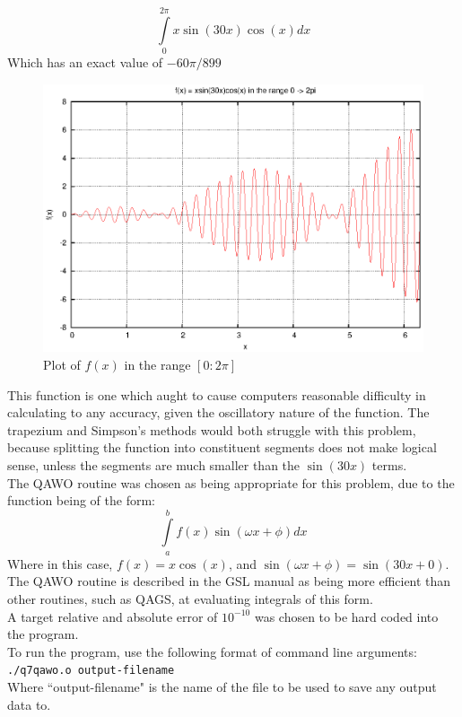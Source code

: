 \documentclass[pdf,color]{UoBnote}
\begin{document}
			\begin{equation}\label{eq:int2}
				\int\limits_0^{2\pi}x\sin{(30x)}\cos{(x)} dx	
			\end{equation}
			Which has an exact value of $-60\pi/899$
			\begin{figure}[H]
					\centering
						\includegraphics{figures/q7b_labelled.eps}
					\caption{Plot of $f(x)$ in the range $[0:2\pi]$}
					\label{fig:q7b}
				\end{figure}
				This function is one which aught to cause computers reasonable difficulty in calculating to any accuracy, given the oscillatory nature of the function. The trapezium and Simpson's methods would both struggle with this problem, because splitting the function into constituent segments does not make logical sense, unless the segments are much smaller than the $\sin(30x)$ terms.\\
			The QAWO routine was chosen as being appropriate for this problem, due to the function being of the form:
			\begin{equation}
			\int\limits_a^b f(x)\sin(\omega x + \phi) dx
			\end{equation}
			Where in this case, $f(x) = x\cos(x)$, and $\sin(\omega x +\phi) = \sin(30x + 0)$.\\
			The QAWO routine is described in the GSL manual as being more efficient than other routines, such as QAGS, at evaluating integrals of this form.\\
			A target relative and absolute error of $10^{-10}$ was chosen to be hard coded into the program.\\
			To run the program, use the following format of command line arguments:\\
				\texttt{./q7\textunderscore qawo.o output-filename}\\
			Where ``output-filename" is the name of the file to be used to save any output data to.
			
\end{document}

